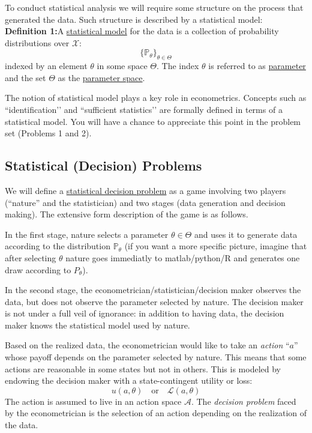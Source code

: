 \documentclass[11pt]{article} %
\begin{document}
To conduct statistical analysis we will require some structure on the process that generated the data. Such structure is described by a statistical model:\\ 

\noindent \textbf{Definition 1:}A \underline{statistical model} for the data is a collection of probability distributions over $\mathcal{X}$:
\[ \{\mathbb{P}_{\theta}\}_{\theta \in \Theta} \]
 indexed by an element $\theta$ in some space $\Theta$. The index $\theta$ is referred to as \underline{parameter} and the set $\Theta$ as the \underline{parameter space}. 
 
The notion of statistical model plays a key role in econometrics. Concepts such as ``identification’’ and ``sufficient statistics’’ are formally defined in terms of a statistical model. You will have a chance to appreciate this point in the problem set (Problems 1 and 2).  

\subsection{Statistical (Decision) Problems}

We will define a \underline{statistical decision problem} as a game involving two players (``nature'' and the statistician) and two stages (data generation and decision making).  The extensive form description of the game is as follows. 

In the first stage, nature selects a parameter $\theta \in \Theta$ and uses it to generate data according to the distribution $\mathbb{P}_{\theta}$ (if you want a more specific picture, imagine that after selecting $\theta$ nature goes immediatly to matlab/python/R and generates one draw according to $P_\theta$). 

In the second stage, the econometrician/statistician/decision maker observes the data, but does not observe the parameter selected by nature. The decision maker is not under a full veil of ignorance: in addition to having data, the decision maker knows the statistical model used by nature. 

 Based on the realized data, the econometrician would like to take an \emph{action} ``$a$'' whose payoff depends on the parameter selected by nature. This means that some actions are reasonable in some states but not in others. This is modeled by endowing the decision maker with a state-contingent utility or loss:
$$u(a,\theta) \quad \text{or} \quad \mathcal{L}(a,\theta) $$
The action is assumed to live in an action space $\mathcal{A}$. The \emph{decision problem} faced by the econometrician is the selection of an action depending on the realization of the data. 
\end{document}
